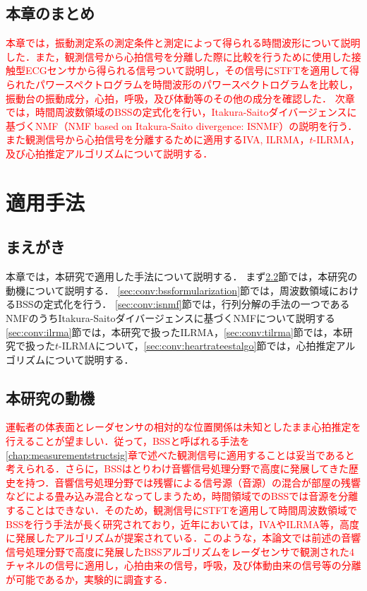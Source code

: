\section{本章のまとめ}
\label{sec:conv:conclusion2}
\textcolor{red}{本章では，振動測定系の測定条件と測定によって得られる時間波形について説明した．また，観測信号から心拍信号を分離した際に比較を行うために使用した接触型ECGセンサから得られる信号ついて説明し，その信号にSTFTを適用して得られたパワースペクトログラムを時間波形のパワースペクトログラムを比較し，振動台の振動成分，心拍，呼吸，及び体動等のその他の成分を確認した．
次章では，時間周波数領域のBSSの定式化を行い，Itakura-Saitoダイバージェンスに基づくNMF（NMF based on Itakura-Saito divergence: ISNMF）の説明を行う．また観測信号から心拍信号を分離するために適用するIVA, ILRMA，$t$-ILRMA，及び心拍推定アルゴリズムについて説明する．}


\chapter{適用手法}
\label{chap:methods}

\section{まえがき}
本章では，本研究で適用した手法について説明する．
まず\ref{sec:conv:researchmotivation}節では，本研究の動機について説明する．
\ref{sec:conv:bssformularization}節では，周波数領域におけるBSSの定式化を行う．
\ref{sec:conv:isnmf}節では，行列分解の手法の一つであるNMFのうちItakura-Saitoダイバージェンスに基づくNMFについて説明する
\ref{sec:conv:ilrma}節では，本研究で扱ったILRMA，\ref{sec:conv:tilrma}節では，本研究で扱った$t$-ILRMAについて，\ref{sec:conv:heartrateestalgo}節では，心拍推定アルゴリズムについて説明する．

\section{本研究の動機}
\label{sec:conv:researchmotivation}
\textcolor{red}{運転者の体表面とレーダセンサの相対的な位置関係は未知としたまま心拍推定を行えることが望ましい．従って，BSSと呼ばれる手法を\ref{chap:measurementstructsig}章で述べた観測信号に適用することは妥当であると考えられる．さらに，BSSはとりわけ音響信号処理分野で高度に発展してきた歴史を持つ．音響信号処理分野では残響による信号源（音源）の混合が部屋の残響などによる畳み込み混合となってしまうため，時間領域でのBSSでは音源を分離することはできない．そのため，観測信号にSTFTを適用して時間周波数領域でBSSを行う手法が長く研究されており，近年においては，IVAやILRMA等，高度に発展したアルゴリズムが提案されている．このような，本論文では前述の音響信号処理分野で高度に発展したBSSアルゴリズムをレーダセンサで観測された4チャネルの信号に適用し，心拍由来の信号，呼吸，及び体動由来の信号等の分離が可能であるか，実験的に調査する．}

